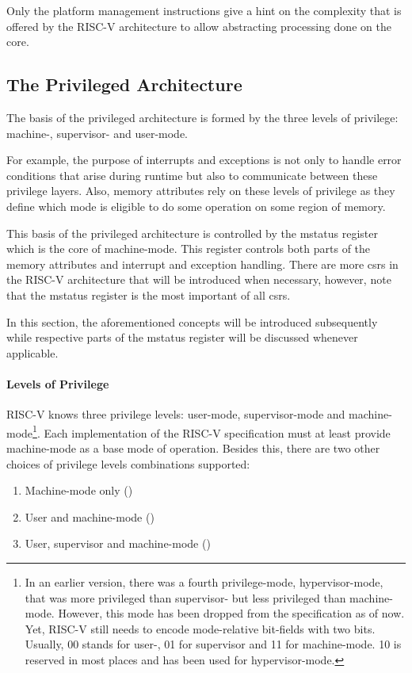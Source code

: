 Only the platform management instructions give a hint on the complexity that is offered by the RISC-V architecture to allow abstracting processing done on the core.

\subsection{The Privileged Architecture}
\label{sec:rv-priv-arch}

The basis of the privileged architecture is formed by the three levels of privilege: machine-, supervisor- and user-mode.

For example, the purpose of interrupts and exceptions is not only to handle error conditions that arise during runtime but also to communicate between these privilege layers.
Also, memory attributes rely on these levels of privilege as they define which mode is eligible to do some operation on some region of memory.

This basis of the privileged architecture is controlled by the \gls{mstatus} register which is the core of machine-mode.
This register controls both parts of the memory attributes and interrupt and exception handling.
There are more \glspl{csr} in the RISC-V architecture that will be introduced when necessary, however, note that the \gls{mstatus} register is the most important of all \glspl{csr}.

In this section, the aforementioned concepts will be introduced subsequently while respective parts of the \gls{mstatus} register will be discussed whenever applicable.

\paragraph{Levels of Privilege}

RISC-V knows three privilege levels: user-mode, supervisor-mode and machine-mode\footnote{%
    In an earlier version, there was a fourth privilege-mode, hypervisor-mode, that was more privileged than supervisor- but less privileged than machine-mode.
    However, this mode has been dropped from the specification as of now.
    Yet, RISC-V still needs to encode mode-relative bit-fields with two bits.
    Usually, 00 stands for user-, 01 for supervisor and 11 for machine-mode.
    10 is reserved in most places and has been used for hypervisor-mode.
}.
Each implementation of the RISC-V specification must at least provide machine-mode as a base mode of operation.
Besides this, there are two other choices of privilege levels combinations supported:
\begin{enumerate}
    \item Machine-mode only ()
    \item User and machine-mode ()
    \item User, supervisor and machine-mode ()
\end{enumerate}

